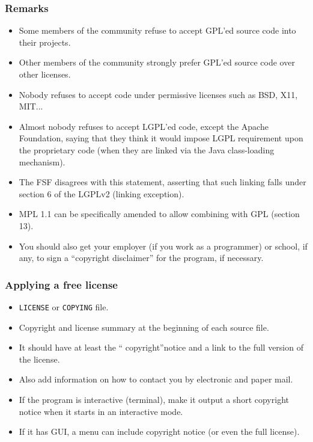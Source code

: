 \begin{frame}
\frametitle{Remarks}

\small

\begin{itemize}
\item Some members of the community refuse to accept GPL'ed source code into their projects.
\item Other members of the community strongly prefer GPL'ed source code over other licenses.
\item Nobody refuses to accept code under permissive licenses such as BSD, X11, MIT... 
\item Almost nobody refuses to accept LGPL'ed code, except the Apache Foundation, saying that they think it would impose LGPL requirement upon the proprietary code (when they are linked via the Java class-loading mechanism).
\item The FSF disagrees with this statement, asserting that such linking falls under section 6 of the LGPLv2 (linking exception).
\item MPL 1.1 can be specifically amended to allow combining with GPL (section 13).
\item You should also get your employer (if you work as a programmer) or school, if any, to sign a ``copyright disclaimer'' for the program, if necessary. 
\end{itemize}

\end{frame}





\begin{frame}
\frametitle{Applying a free license}


\begin{itemize}
\item \texttt{LICENSE} or \texttt{COPYING} file.
\item Copyright and license summary at the beginning of each source file.
\item It should have at least the `` copyright''notice and a link to the full version of the license.
\item Also add information on how to contact you by electronic and paper mail.
\item If the program is interactive (terminal), make it output a short copyright notice 
when it starts in an interactive mode.
\item If it has GUI, a menu can include copyright notice (or even the full license).
\end{itemize}

\end{frame}

